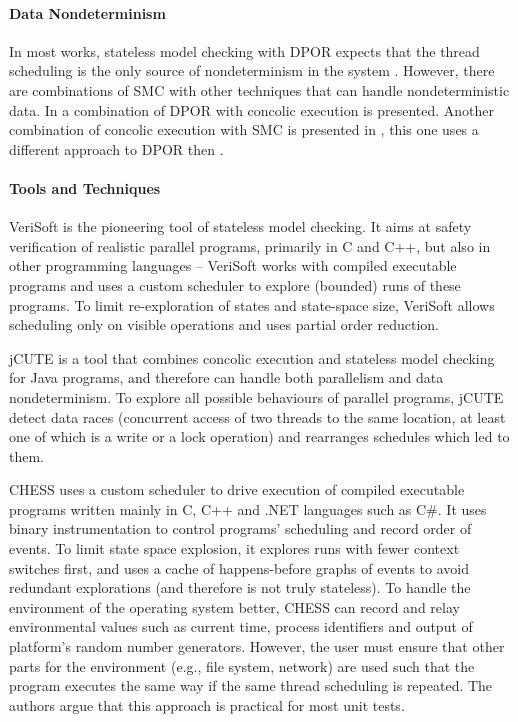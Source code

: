 \paragraph{Data Nondeterminism}

In most works, stateless model checking with DPOR expects that the thread
scheduling is the only source of nondeterminism in the system .
However, there are combinations of SMC with other techniques that can handle
nondeterministic data.
In  a combination of DPOR with concolic execution is presented.
Another combination of concolic execution with SMC is presented in , this one uses a different approach to DPOR then .

\paragraph{Tools and Techniques}

VeriSoft  is the pioneering tool of stateless model checking.
It aims at safety verification of realistic parallel programs, primarily in C and C++, but also in other programming languages -- VeriSoft works with compiled executable programs and uses a custom scheduler to explore (bounded) runs of these programs.
To limit re-exploration of states and state-space size, VeriSoft allows scheduling only on visible operations and uses partial order reduction.

jCUTE  is a tool that combines concolic execution and stateless model checking for Java programs, and therefore can handle both parallelism and data nondeterminism.
To explore all possible behaviours of parallel programs, jCUTE detect data races (concurrent access of two threads to the same location, at least one of which is a write or a lock operation) and rearranges schedules which led to them.

CHESS  uses a custom scheduler to drive execution of compiled executable programs written mainly in C, C++ and .NET languages such as C\#.
It uses binary instrumentation to control programs' scheduling and record order of events.
To limit state space explosion, it explores runs with fewer context switches first, and uses a cache of happens-before graphs of events to avoid redundant explorations (and therefore is not truly stateless).
To handle the environment of the operating system better, CHESS can record and relay environmental values such as current time, process identifiers and output of platform's random number generators.
However, the user must ensure that other parts for the environment (e.g., file system, network) are used such that the program executes the same way if the same thread scheduling is repeated.
The authors argue that this approach is practical for most unit tests.

